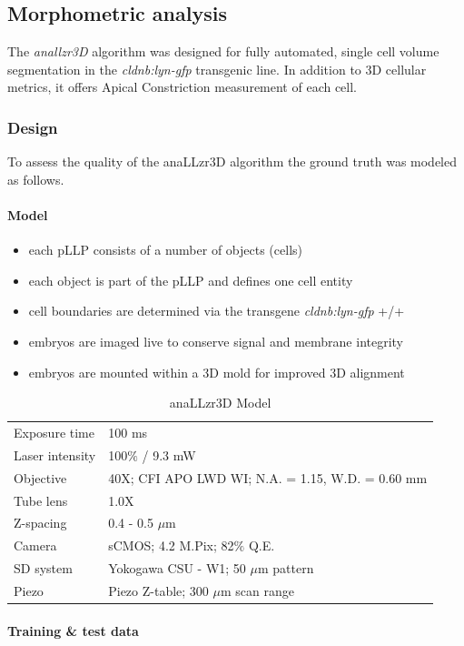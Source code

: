 \documentclass[11pt,singlespacinge,twoside]{reedthesis} %
\providecommand{\tightlist}{%
  \setlength{\itemsep}{0pt}\setlength{\parskip}{0pt}}
\theoremstyle{definition}
\theoremstyle{definition}
\theoremstyle{definition}
\theoremstyle{remark}
\begin{document}
\hypertarget{morphometric-analysis}{%
\subsection{Morphometric analysis}\label{morphometric-analysis}}

The \emph{anallzr3D} algorithm was designed for fully automated, single cell volume segmentation in the \emph{cldnb:lyn-gfp} transgenic line. In addition to 3D cellular metrics, it offers Apical Constriction measurement of each cell.

\hypertarget{design-1}{%
\subsubsection{Design}\label{design-1}}

To assess the quality of the anaLLzr3D algorithm the ground truth was modeled as follows.

\hypertarget{model-1}{%
\paragraph{Model}\label{model-1}}
\begin{itemize}
\tightlist
\item
  each pLLP consists of a number of objects (cells)
\item
  each object is part of the pLLP and defines one cell entity
\item
  cell boundaries are determined via the transgene \emph{cldnb:lyn-gfp} +/+
\item
  embryos are imaged live to conserve signal and membrane integrity
\item
  embryos are mounted within a 3D mold for improved 3D alignment
\end{itemize}
\begin{table}[!h]

\caption{\label{tab:model3DGrT}anaLLzr3D Model}
\centering
\begin{tabu} to 
\toprule
{}  Exposure time & 100 ms\\
Laser intensity & 100$\%$ / 9.3 mW\\
  Objective & 40X; CFI APO LWD WI; N.A. = 1.15, W.D. = 0.60 mm\\
Tube lens & 1.0X\\
  Z-spacing & 0.4 - 0.5 $\mu$m\\
\addlinespace
Camera & sCMOS; 4.2 M.Pix; 82$\%$ Q.E.\\
  SD system & Yokogawa CSU - W1; 50 $\mu$m pattern\\
Piezo & Piezo Z-table; 300 $\mu$m scan range\\
\bottomrule
\end{tabu}
\end{table}
\hypertarget{training-test-data-1}{%
\paragraph{Training \& test data}\label{training-test-data-1}}
\end{document}
